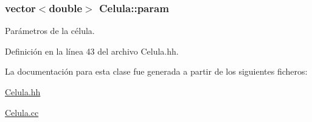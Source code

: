 \hypertarget{class_celula_a386c6da3af12b5662e3866675d60a4b7}{
\subsubsection[{param}]{\setlength{\rightskip}{0pt plus 5cm}vector$<$double$>$ Celula\+::param\hspace{0.3cm}{\ttfamily [private]}}}\label{class_celula_a386c6da3af12b5662e3866675d60a4b7}


Parámetros de la célula. 



Definición en la línea 43 del archivo Celula.\+hh.



La documentación para esta clase fue generada a partir de los siguientes ficheros\+:\begin{DoxyCompactItemize}
\item 
\hyperlink{_celula_8hh}{Celula.\+hh}\item 
\hyperlink{_celula_8cc}{Celula.\+cc}\end{DoxyCompactItemize}
